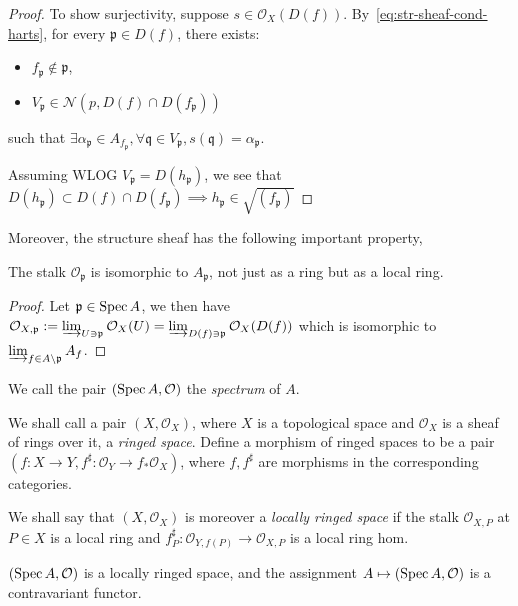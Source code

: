 \documentclass[000-main.tex]{subfiles}
\begin{document}
\begin{proof}
  To show surjectivity, suppose $s\in \mathcal{O}_X(D(f))$.
  By~\eqref{eq:str-sheaf-cond-harts}, for every $\mathfrak{p}\in D(f)$, there exists:
  \begin{itemize}
    \item $f_\mathfrak{p}\not\in \mathfrak{p}$,
    \item $V_\mathfrak{p}\in \mathcal{N}(p, D(f)\cap D(f_\mathfrak{p}))$
  \end{itemize}
  such that $\exists \alpha_\mathfrak{p}\in A_{f_\mathfrak{p}}, \forall \mathfrak{q}\in V_\mathfrak{p}, s(\mathfrak{q}) = \alpha_\mathfrak{p}$.

  Assuming WLOG $V_\mathfrak{p} = D(h_\mathfrak{p})$, we see that $D(h_\mathfrak{p}) \subset D(f)\cap D(f_\mathfrak{p}) \implies h_\mathfrak{p}\in \sqrt{(f_\mathfrak{p})}$
\end{proof}

Moreover, the structure sheaf has the following important property,
\begin{lemma}
  The stalk $\mathcal{O}_{\mathfrak{p}}$ is isomorphic to $A_{\mathfrak{p}}$, not just as a ring but as a local ring.
\end{lemma}
\begin{proof}\TOPROVE
  Let $\mathfrak{p}\in\operatorname{Spec} A$, we then have $\mathcal{O}_{X,\mathfrak{p}} := \varinjlim_{U\ni\mathfrak{p}}\mathcal{O}_X(U) = \varinjlim_{D(f)\ni\mathfrak{p}}\mathcal{O}_X(D(f))$ which is isomorphic to $\varinjlim_{f\in A\setminus\mathfrak{p}}A_f$.
\end{proof}

We call the pair $(\operatorname{Spec} A, \mathcal{O})$ the \emph{spectrum} of $A$.

\begin{definition}
  We shall call a pair $(X, \mathcal{O}_X)$, where $X$ is a topological space and $\mathcal{O}_X$ is a sheaf of rings over it, a \emph{ringed space}.
  Define a morphism of ringed spaces to be a pair $(f : X \to Y, f^\sharp : \mathcal{O}_Y \to f_\ast \mathcal{O}_X)$, where $f, f^\sharp$ are morphisms in the corresponding categories.

  We shall say that $(X, \mathcal{O}_X)$ is moreover a \emph{locally ringed space} if the stalk $\mathcal{O}_{X, P}$ at $P \in X$ is a local ring and $f^\sharp_P : \mathcal{O}_{Y, f(P)} \to \mathcal{O}_{X, P}$ is a local ring hom.
\end{definition}

\begin{lemma}
  $(\operatorname{Spec} A, \mathcal{O})$ is a locally ringed space, and the assignment $A \mapsto (\operatorname{Spec} A , \mathcal{O})$ is a contravariant functor.
\end{lemma}
\end{document}
